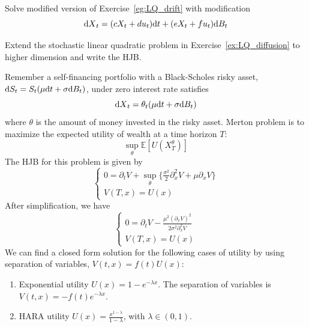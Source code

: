 \documentclass[11pt]{book}
\newcommand{\dd}{\text{\normalfont d}}
\newcommand{\dt}{\text{\normalfont d}t}
\newcommand{\dX}{\text{\normalfont d}X}
\begin{document}
\begin{ex}\label{ex:LQ_diffusion}
Solve modified version of Exercise~\ref{eg:LQ_drift} with modification 
\begin{equation}
        {\dX}_t=(cX_t+du_t){{\dt}}+(eX_t+fu_t) {\dd}B_t
    \end{equation}
\end{ex}
\begin{ex}
    Extend the stochastic linear quadratic problem in Exercise~\ref{ex:LQ_diffusion} to higher dimension and write the HJB.
\end{ex}
\begin{eg}
    {}
    Remember a self-financing portfolio with a 
    Black-Scholes risky asset, 
    ${{\dd}}S_t=S_t(\mu {{\dt}}+\sigma {\dd}B_t)$, 
    under zero interest rate  satisfies
    \begin{equation}
        {\dX}_t=\theta_t(\mu {{\dt}}+ \sigma {\dd}B_t)
    \end{equation}
    where $\theta$ is the amount of money invested in the risky asset.
    Merton problem is to maximize the expected utility of wealth at a time horizon $T$:
    \begin{equation}
        \sup_{\theta}\mathbb{E}[U(X_T^\theta)]
    \end{equation}
    The HJB for this problem is given by 
    \begin{equation}
        \begin{cases}
            0=\partial_t V + \sup_{\theta}\Big\{
            \frac{\sigma^2}{2}\partial^2_x V +\mu \partial_x V\Big\}\\
            V(T,x)=U(x)
        \end{cases}
    \end{equation}
    After simplification, we have 
        \begin{equation}
        \begin{cases}
            0=\partial_t V -\frac{\mu^2 (\partial_x V)^2}{2\sigma^2\partial^2_x V}\\
            V(T,x)=U(x)
        \end{cases}
    \end{equation}
    We can find a closed form solution for the following cases of utility by using separation of variables, $V(t,x)=f(t)U(x)$:
    \begin{enumerate}
        \item Exponential utility $U(x)=1-e^{-\lambda x}$. The separation of variables is $V(t,x)=-f(t)e^{-\lambda x}$.
        \item HARA utility $U(x)=\frac{x^{1-\lambda}}{1-\lambda}$, with $\lambda\in(0,1)$.
    \end{enumerate}
\end{eg}
\end{document}
